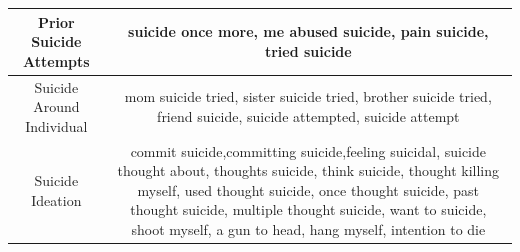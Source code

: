 \documentclass[11pt]{article}
\begin{document}
\begin{table}
\begin{tabulary}{500pt}{|C|C|}
  Prior Suicide Attempts                & suicide once more, me abused suicide, pain suicide, tried suicide                                                                                                                                                                                                                                                                                                                                                                                                                                                                                                                                                                                                                                                                                                                                                                         \\ \hline
  Suicide Around Individual             & mom suicide tried, sister suicide tried, brother suicide tried, friend suicide, suicide attempted, suicide attempt                                                                                                                                                                                                                                                                                                                                                                                                                                                                                                                                                                                                                                                                                                                        \\ \hline
   Suicide Ideation                      & commit suicide,committing suicide,feeling suicidal, suicide thought about, thoughts suicide, think suicide, thought killing myself, used thought suicide, once thought suicide, past thought suicide, multiple thought suicide, want to suicide, shoot myself, a gun to head, hang myself, intention to die                                                                                                                                                                                                                                                                                                                                                                                                                                                                                                                               \\ \hline

\end{tabulary}
\end{table}
\end{document}
